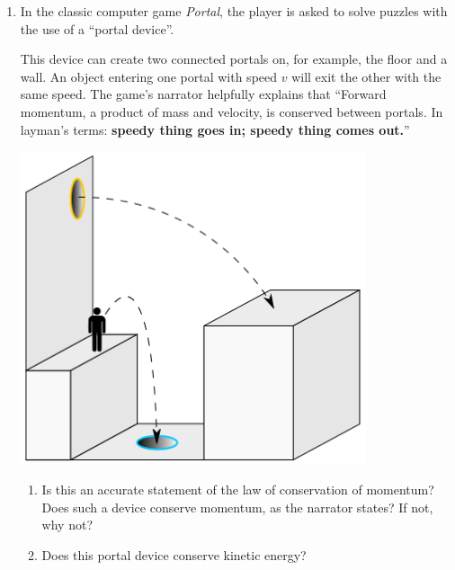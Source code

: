 \documentclass[12pt]{article}
\begin{document}
\Large
\centerline{}

\normalsize
\centerline{}

\begin{enumerate}


\item{In the classic computer game {\it Portal}, the player is asked to solve
	puzzles with the use of a ``portal device''.
	

\begin{minipage}{0.4\textwidth}
	This device can create two connected portals
	on, for example, the floor and a wall. An object entering one portal with speed $v$
	will exit the other with the same speed. 
	The game's narrator helpfully explains that ``Forward momentum, a product of mass
	and velocity, is conserved between portals. In layman's terms: {\bf speedy thing
		goes in; speedy thing comes out.}''
	\end{minipage}
	\begin{minipage}{0.5\textwidth}
		\hspace{0.1\textwidth}
	\includegraphics[width=0.8\textwidth]{Portal_physics-2.png}
\end{minipage}
	\begin{enumerate}
	\item Is this an accurate statement of the law of conservation of momentum? Does such a device conserve momentum, as the narrator states? If not, why not?
	
	\item Does this portal device conserve kinetic energy?
	

\end{enumerate}}
\end{enumerate}
\end{document}
